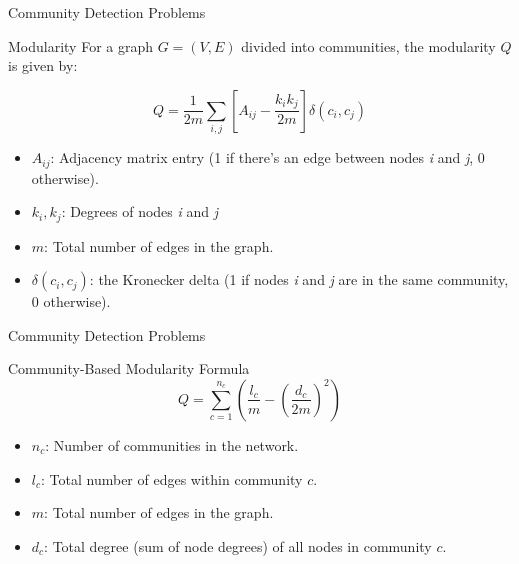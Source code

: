 \documentclass[compress]{beamer}
\begin{document}
\begin{frame}[t]{Community Detection Problems}
    \begin{block}{Modularity}
        For a graph \(G = (V, E)\) divided into communities, the modularity \(Q\) is given by:

        \[Q = \frac{1}{2m} \sum_{i,j} \left[ A_{ij} - \frac{k_i k_j}{2m} \right] \delta(c_i, c_j)\]
    \end{block}

    \begin{itemize}
        \item \(A_{ij}\): Adjacency matrix entry (1 if there's an edge between nodes \textit{i} and \textit{j}, 0 otherwise).
        \item \(k_i,k_j\): Degrees of nodes \textit{i} and \textit{j}
        \item \(m\): Total number of edges in the graph.
        \item \(\delta(c_i, c_j)\): the Kronecker delta (1 if nodes \textit{i} and \textit{j} are in the same community, 0 otherwise).
    \end{itemize}
\end{frame}

\begin{frame}[t]{Community Detection Problems}
    \begin{block}{Community-Based Modularity Formula}
        \[Q = \sum_{c=1}^{n_c} \left( \frac{l_c}{m} - \left( \frac{d_c}{2m} \right)^2 \right)\]
    \end{block}

    \begin{itemize}
        \item \(n_c\): Number of communities in the network.
        \item \(l_c\): Total number of edges within community \(c\).
        \item \(m\): Total number of edges in the graph.
        \item \(d_c\): Total degree (sum of node degrees) of all nodes in community \(c\).
    \end{itemize}
\end{frame}
\end{document}
